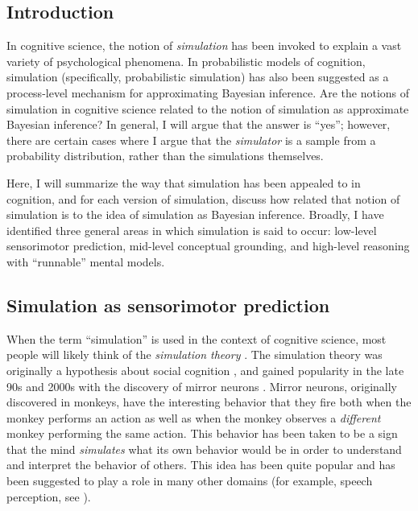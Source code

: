 \documentclass[12pt]{article}
\begin{document}


\subsection*{Introduction}

In cognitive science, the notion of \textit{simulation} has been invoked to explain a vast variety of psychological phenomena. In probabilistic models of cognition, simulation (specifically, probabilistic simulation) has also been suggested as a process-level mechanism for approximating Bayesian inference. Are the notions of simulation in cognitive science related to the notion of simulation as approximate Bayesian inference? In general, I will argue that the answer is ``yes''; however, there are certain cases where I argue that the \textit{simulator} is a sample from a probability distribution, rather than the simulations themselves.

Here, I will summarize the way that simulation has been appealed to in cognition, and for each version of simulation, discuss how related that notion of simulation is to the idea of simulation as Bayesian inference. Broadly, I have identified three general areas in which simulation is said to occur: low-level sensorimotor prediction, mid-level conceptual grounding, and high-level reasoning with ``runnable'' mental models.

\subsection*{Simulation as sensorimotor prediction}

When the term ``simulation'' is used in the context of cognitive science, most people will likely think of the \textit{simulation theory} \citep{Gallese1998}. The simulation theory was originally a hypothesis about social cognition \citep{Gordon1992,Goldman1992}, and gained popularity in the late 90s and 2000s with the discovery of mirror neurons \citep{Gallese1998}. Mirror neurons, originally discovered in monkeys, have the interesting behavior that they fire both when the monkey performs an action as well as when the monkey observes a \textit{different} monkey performing the same action. This behavior has been taken to be a sign that the mind \textit{simulates} what its own behavior would be in order to understand and interpret the behavior of others. This idea has been quite popular and has been suggested to play a role in many other domains (for example, speech perception, see \cite{Fischer2008}).
\end{document}
